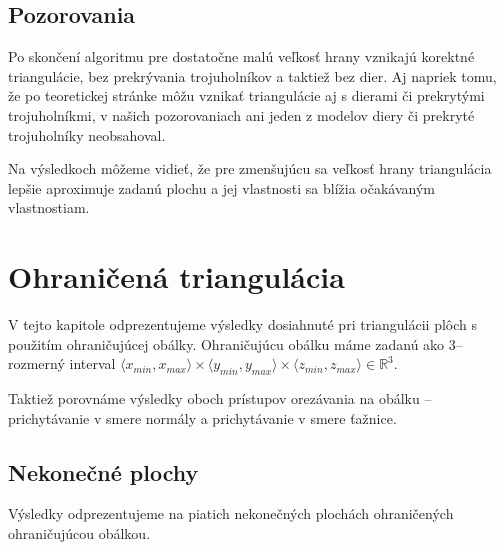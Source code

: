 \newpage
\subsection{Pozorovania}
Po skončení algoritmu pre dostatočne malú veľkosť hrany vznikajú korektné triangulácie,
bez prekrývania trojuholníkov a taktiež bez dier. Aj napriek tomu, že po teoretickej stránke
môžu vznikať triangulácie aj s dierami či prekrytými trojuholníkmi, 
v našich pozorovaniach ani jeden z modelov diery či prekryté trojuholníky neobsahoval.

Na výsledkoch môžeme vidieť, že pre zmenšujúcu sa veľkosť hrany triangulácia lepšie 
aproximuje zadanú plochu a jej vlastnosti sa blížia očakávaným vlastnostiam.

\section{Ohraničená triangulácia}

V tejto kapitole odprezentujeme výsledky dosiahnuté pri triangulácii plôch s použitím 
ohraničujúcej obálky. Ohraničujúcu obálku máme zadanú ako $3$--rozmerný interval 
$\langle x_{min}, x_{max}\rangle
\times \langle y_{min}, y_{max}\rangle \times \langle z_{min}, z_{max}\rangle \in \mathbb{R}^3.$ 

Taktiež porovnáme výsledky oboch prístupov orezávania na obálku -- prichytávanie v smere normály
a prichytávanie v smere ťažnice.

\subsection{Nekonečné plochy}

Výsledky odprezentujeme na piatich nekonečných plochách ohraničených ohraničujúcou obálkou.

